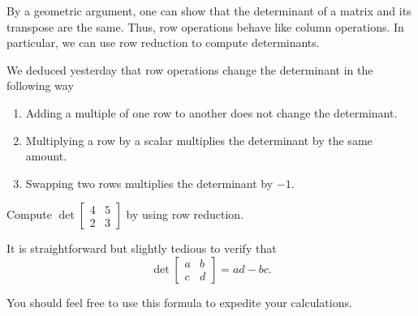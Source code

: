 
\begin{applicationActivities}{2}{26}

\begin{fact}
By a geometric argument, one can show that the determinant of a matrix and its transpose are the same.    Thus, row operations behave like column operations.  In particular, we can use row reduction to compute determinants.
\end{fact}

\begin{fact}
We deduced yesterday that row operations change the determinant in the following way
\begin{enumerate}
\item Adding a multiple of one row to another does not change the determinant.
\item Multiplying a row by a scalar multiplies the determinant by the same amount.
\item Swapping two rows multiplies the determinant by $-1$.
\end{enumerate}
\end{fact}

\begin{activity}{10}
  Compute $\det \begin{bmatrix} 4 & 5 \\ 2 & 3 \end{bmatrix}$ by using row reduction.
\end{activity}

\begin{fact}
It is straightforward but slightly tedious to verify that $$\det \begin{bmatrix} a & b \\ c & d \end{bmatrix} = ad-bc.$$

You should feel free to use this formula to expedite your calculations.
\end{fact}



\end{applicationActivities}
